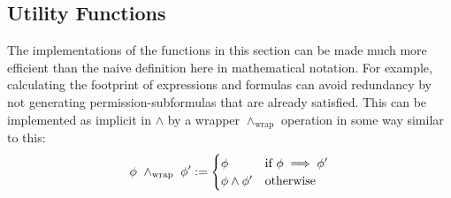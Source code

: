 \subsection{Utility Functions}

\noindent
The implementations of the functions in this section can be made much more efficient than the naive definition here in mathematical notation. For example, calculating the footprint of expressions and formulas can avoid redundancy by not generating permission-subformulas that are already satisfied. This can be implemented as implicit in $\land$ by a wrapper $\land_\text{wrap}$ operation in some way similar to this:
\begin{align*}
  \phi \ \land_\text{wrap} \ \phi^\prime := \begin{cases}
    \phi & \text{if} \ \phi \implies \phi^\prime \\
    \phi \land \phi^\prime & \text{otherwise}
  \end{cases}
\end{align*}

